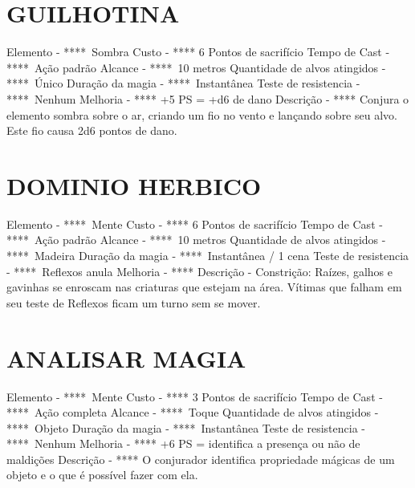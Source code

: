 \documentclass{article}%
\begin{document}
\section{GUILHOTINA}%
\label{sec:GUILHOTINA}%
Elemento {-} ****~Sombra\newline%
Custo {-} **** 6 Pontos de sacrifício\newline%
Tempo de Cast {-} ****~Ação padrão\newline%
Alcance {-} ****~10 metros\newline%
Quantidade de alvos atingidos {-} ****~Único\newline%
Duração da magia {-} ****~Instantânea\newline%
Teste de resistencia {-} ****~Nenhum\newline%
Melhoria {-} **** +5 PS = +d6 de dano\newline%
Descrição {-} **** Conjura o elemento sombra sobre o ar, criando um fio no vento e lançando sobre seu alvo. Este fio causa 2d6 pontos de dano.\newline%

%
\section{DOMINIO HERBICO}%
\label{sec:DOMINIOHERBICO}%
Elemento {-} ****~Mente\newline%
Custo {-} **** 6 Pontos de sacrifício\newline%
Tempo de Cast {-} ****~Ação padrão\newline%
Alcance {-} ****~10 metros\newline%
Quantidade de alvos atingidos {-} ****~Madeira\newline%
Duração da magia {-} ****~Instantânea / 1 cena\newline%
Teste de resistencia {-} ****~Reflexos anula\newline%
Melhoria {-} ****\newline%
Descrição {-} Constrição: Raízes, galhos e gavinhas se enroscam nas criaturas que estejam na área. Vítimas que falham em seu teste de Reflexos ficam um turno sem se mover.\newline%

%
\section{ANALISAR MAGIA}%
\label{sec:ANALISARMAGIA}%
Elemento {-} ****~Mente\newline%
Custo {-} **** 3 Pontos de sacrifício\newline%
Tempo de Cast {-} ****~Ação completa\newline%
Alcance {-} ****~Toque\newline%
Quantidade de alvos atingidos {-} ****~Objeto\newline%
Duração da magia {-} ****~Instantânea\newline%
Teste de resistencia {-} ****~Nenhum\newline%
Melhoria {-} **** +6 PS = identifica a presença ou não de maldições\newline%
Descrição {-} **** O conjurador identifica propriedade mágicas de um objeto e o que é possível fazer com ela.\newline%
\end{document}

